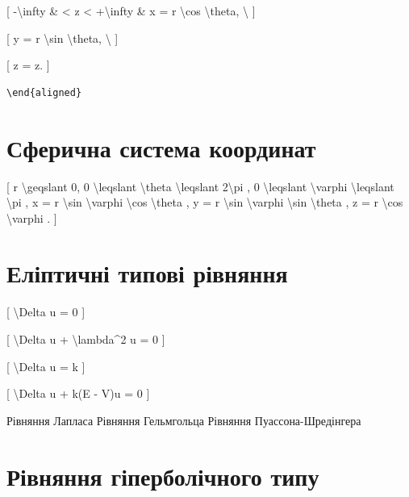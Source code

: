 \documentclass[
]{article}
\begin{document}
{{[} -\textbackslash infty \& \textless{} z \textless{}
+\textbackslash infty \& x = r \textbackslash cos \textbackslash theta,
\textbackslash{} {]}

{[} y = r \textbackslash sin \textbackslash theta, \textbackslash{} {]}

{[} z = z. {]}

\begin{verbatim}
\end{aligned}
\end{verbatim}

\section{Сферична система
координат}\label{ux441ux444ux435ux440ux438ux447ux43dux430-ux441ux438ux441ux442ux435ux43cux430-ux43aux43eux43eux440ux434ux438ux43dux430ux442-1}

{[} r \textbackslash geqslant 0, 0 \textbackslash leqslant
\textbackslash theta \textbackslash leqslant 2\textbackslash pi , 0
\textbackslash leqslant \textbackslash varphi \textbackslash leqslant
\textbackslash pi , x = r \textbackslash sin \textbackslash varphi
\textbackslash cos \textbackslash theta , y = r \textbackslash sin
\textbackslash varphi \textbackslash sin \textbackslash theta , z = r
\textbackslash cos \textbackslash varphi . {]}

\section{Еліптичні типові
рівняння}\label{ux435ux43bux456ux43fux442ux438ux447ux43dux456-ux442ux438ux43fux43eux432ux456-ux440ux456ux432ux43dux44fux43dux43dux44f}

{[} \textbackslash Delta u = 0 {]}

{[} \textbackslash Delta u + \textbackslash lambda\^{}2 u = 0 {]}

{[} \textbackslash Delta u = k {]}

{[} \textbackslash Delta u + k(E - V)u = 0 {]}

Рівняння Лапласа Рівняння Гельмгольца Рівняння Пуассона-Шредінгера

\section{Рівняння гіперболічного
типу}\label{ux440ux456ux432ux43dux44fux43dux43dux44f-ux433ux456ux43fux435ux440ux431ux43eux43bux456ux447ux43dux43eux433ux43e-ux442ux438ux43fux443-1}

}
\end{document}
